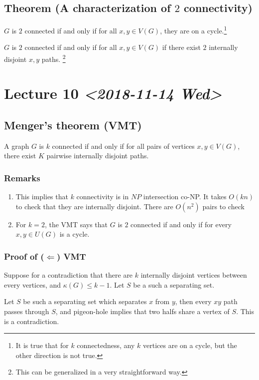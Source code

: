 \documentclass[11pt]{article}
\begin{document}
\subsection{Theorem (A characterization of \(2\) connectivity)}
\label{sec:org69e1be6}
\(G\) is \(2\) connected if and only if for all \(x, y \in V(G)\), they are on a
cycle.\footnote{It is true that for \(k\) connectedness, any \(k\) vertices are on a cycle,
but the other direction is not true.}

\(G\) is \(2\) connected if and only if for all \(x, y \in V(G)\) if there exist
\(2\) internally disjoint \(x, y\) paths. \footnote{This can be generalized in a very straightforward way.}
\section{Lecture 10 \textit{<2018-11-14 Wed>}}
\label{sec:org4bdeb67}
\subsection{Menger's theorem (VMT)}
\label{sec:orga265129}
A graph \(G\) is \(k\) connected if and only if for all pairs of vertices \(x, y
   \in V(G)\), there exist \(K\) pairwise internally disjoint paths.
\subsubsection{Remarks}
\label{sec:orgba0cd21}
\begin{enumerate}
\item This implies that \(k\) connectivity is in \(NP\) intersection co-NP. It
takes \(O(kn)\) to check that they are internally disjoint. There are
\(O(n^2)\) pairs to check
\item For \(k=2\), the VMT says that \(G\) is \(2\) connected if and only if for
every \(x, y \in U(G)\) is a cycle.
\end{enumerate}
\subsubsection{Proof of (\(\Leftarrow\)) VMT}
\label{sec:org9d144a9}
Suppose for a contradiction that there are \(k\) internally disjoint vertices
between every vertices, and \(\kappa(G) \le k-1\). Let \(S\) be a such a
separating set.

Let \(S\) be such a separating set which separates \(x\) from \(y\), then every
\(xy\) path passes through \(S\), and pigeon-hole implies that two halfs share a
vertex of \(S\). This is a contradiction.
\end{document}
